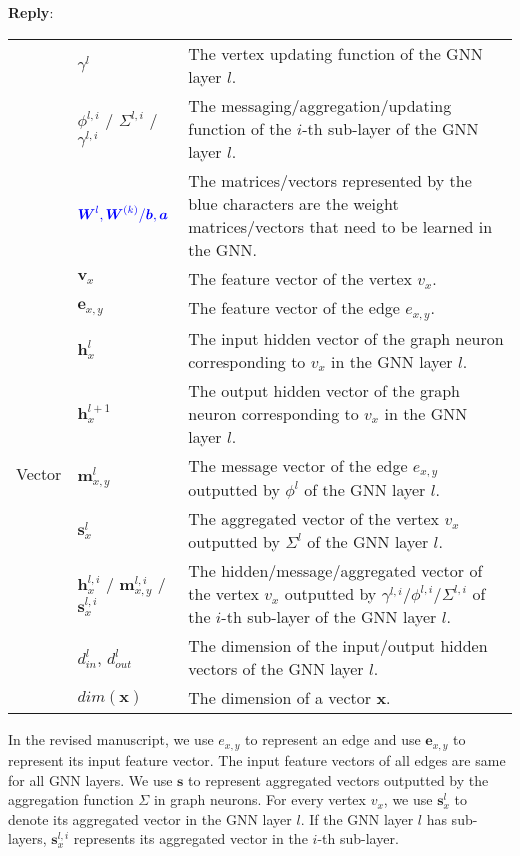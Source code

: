 \documentclass[12pt]{article}
\newcommand{\MyVec}[1]{\boldsymbol{#1}}
\newenvironment{reply}
   {\medskip \noindent \textbf{Reply}:\  }
   {\medskip}
\begin{document}
\begin{reply}
\begin{table}[H]
\begin{tabular}{p{3em}lp{35em}}
        & $\gamma^l$ & The vertex updating function of the GNN layer $l$. \\ 
        & $\phi^{l,i}$ / $\Sigma^{l,i}$ / $\gamma^{l,i}$ & The messaging/aggregation/updating function of the $i$-th sub-layer of the GNN layer  $l$.\\
        & $\textcolor{blue}{\boldsymbol{W}^l, \boldsymbol{W}^{(k)}/\boldsymbol{b}, \boldsymbol{a}}$ & The matrices/vectors represented by the blue characters are the weight matrices/vectors that need to be learned in the GNN. \\  \midrule
        \multirow[c]{8}{3em}{Vector}& $\boldsymbol{v}_x$ & The feature vector of the vertex $v_x$. \\
        & $\boldsymbol{e}_{x,y}$ & The feature vector of the edge $e_{x,y}$.  \\
        & $\boldsymbol{h}_x^{l}$ &  The {input} hidden vector of the graph neuron corresponding to $v_x$ in the GNN layer $l$. \\
        & $\boldsymbol{h}_x^{l+1}$ &  The {output} hidden vector of the graph neuron corresponding to $v_x$ in the GNN layer $l$.\\
        & $\boldsymbol{m}_{x,y}^l$ & The message vector of the edge $e_{x,y}$ outputted by $\phi^l$ of the GNN layer $l$. \\
        & $\boldsymbol{s}_{x}^l$ & The aggregated vector of the vertex $v_x$ outputted by $\Sigma^l$ of the GNN layer $l$. \\
        & $\boldsymbol{h}_{x}^{l,i}$ / $\boldsymbol{m}_{x,y}^{l,i}$ / $\boldsymbol{s}_{x}^{l,i}$ & The hidden/message/aggregated vector of the vertex $v_x$ outputted by $\gamma^{l,i}$/$\phi^{l,i}$/$\Sigma^{l,i}$ of the $i$-th sub-layer of the GNN layer $l$. \\
        & $d^l_{in}$, $d^l_{out}$ &  The dimension of the input/output hidden vectors of the GNN layer $l$. \\
        & $dim(\MyVec{x})$ & The dimension of a vector $\MyVec{x}$. \\
        \bottomrule
    \end{tabular}
\end{table}

    
    In the revised manuscript, we use $e_{x,y}$ to represent an edge and use $\boldsymbol{e}_{x,y}$ to represent its input feature vector.
    The input feature vectors of all edges are same for all GNN layers.
    We use $\boldsymbol{s}$ to represent aggregated vectors outputted by the aggregation function $\Sigma$ in graph neurons.
    For every vertex $v_x$, we use $\boldsymbol{s}^l_x$ to denote its aggregated vector in the GNN layer $l$.
    If the GNN layer $l$ has sub-layers, $\boldsymbol{s}^{l,i}_x$ represents its aggregated vector in the $i$-th sub-layer.
    

\end{reply}
\end{document}
